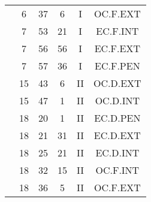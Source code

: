 \documentclass[12pt, a4paper]{article}
\begin{document}
\begin{multicols}{3}
{\begin{tabular}{c c c c c c}
	 	 	 	 & 6 & 37 & 6 & I & OC.F.EXT\\%
	 	 	 	 & 7 & 53 & 21 & I & EC.F.INT\\%
	 	 	 	 & 7 & 56 & 56 & I & EC.F.EXT\\%
	 	 	 	 & 7 & 57 & 36 & I & EC.F.PEN\\%
	 	 	 	 & 15 & 43 & 6 & II & OC.D.EXT\\%
	 	 	 	 & 15 & 47 & 1 & II & OC.D.INT\\%
	 	 	 	 & 18 & 20 & 1 & II & EC.D.PEN\\%
	 	 	 	 & 18 & 21 & 31 & II & EC.D.EXT\\%
	 	 	 	 & 18 & 25 & 21 & II & EC.D.INT\\%
	 	 	 	 & 18 & 32 & 15 & II & OC.F.INT\\%
	 	 	 	 & 18 & 36 & 5 & II & OC.F.EXT\\%
	 	 \end{tabular}
 	}
\end{multicols}
\end{document}

